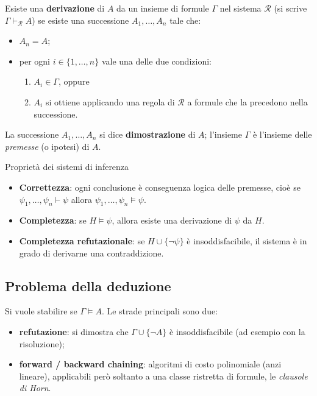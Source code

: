 \documentclass[11pt, a4paper]{article}
\renewcommand{\emph}[1]{\textcolor{verdechiaro}{\itshape #1}}
\begin{document}
Esiste una \textbf{derivazione} di $A$ da un insieme di formule $\Gamma$ nel sistema $\mathcal{R}$ (si scrive $\Gamma \vdash_{\mathcal{R}} A$) se esiste una successione $A_1, \dots, A_n$ tale che:
\begin{itemize}
  \item $A_n = A$;
  \item per ogni $i \in \{1, \dots, n\}$ vale una delle due condizioni:
  \begin{enumerate}
    \item $A_i \in \Gamma$, oppure
    \item $A_i$ si ottiene applicando una regola di $\mathcal{R}$ a formule che la precedono nella successione.
  \end{enumerate}
\end{itemize}

La successione $A_1, \dots, A_n$ si dice \textbf{dimostrazione} di $A$; l'insieme $\Gamma$ è l'insieme delle \emph{premesse} (o ipotesi) di $A$.

\begin{proprietà}{Proprietà dei sistemi di inferenza}
  \begin{itemize}
    \item \textbf{Correttezza}: ogni conclusione è conseguenza logica delle premesse, cioè se $\psi_1,\dots,\psi_n \vdash \psi$ allora $\psi_1,\dots,\psi_n\models\psi$.
    \item \textbf{Completezza}: se $H\models\psi$, allora esiste una derivazione di $\psi$ da $H$.
    \item \textbf{Completezza refutazionale}: se $H\cup\{\lnot\psi\}$ è insoddisfacibile, il sistema è in grado di derivarne una contraddizione.
  \end{itemize}
\end{proprietà}

\subsection{Problema della deduzione}

Si vuole stabilire se $\Gamma\models A$. Le strade principali sono due:
\begin{itemize}
  \item \textbf{refutazione}: si dimostra che $\Gamma\cup\{\lnot A\}$ è insoddisfacibile (ad esempio con la risoluzione);
  \item \textbf{forward / backward chaining}: algoritmi di costo polinomiale (anzi lineare), applicabili però soltanto a una classe ristretta di formule, le \emph{clausole di Horn}.
\end{itemize}
\end{document}
